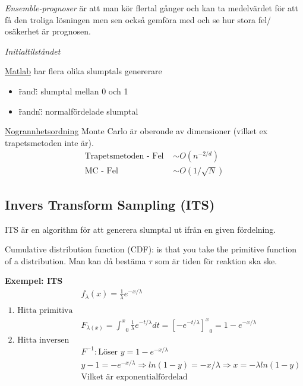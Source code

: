 \textit{Ensemble-prognoser} är att man kör flertal gånger och kan ta medelvärdet
för att få den troliga lösningen men sen också gemföra med och se hur stora fel/
osäkerhet är prognosen. \newline

\textit{Initialtilståndet} \newline

\underline{Matlab} har flera olika slumptals genererare
\begin{itemize}
  \item \"rand\": slumptal mellan 0 och 1
  \item \"randn\": normalfördelade slumptal
\end{itemize}

\underline{Nogrannhetsordning} Monte Carlo är oberonde av dimensioner 
(vilket ex trapetsmetoden inte är).
\begin{align*}
  \text{Trapetsmetoden - Fel } &\sim O(n^{-2/d})  \\
  \text{MC - Fel } &\sim O(1/\sqrt{N}) 
\end{align*}


\newpage

\subsection{Invers Transform Sampling (ITS)}
ITS är en algorithm för att generera slumptal ut ifrån 
en given fördelning.

Cumulative distribution function (CDF): is that you take the 
primitive function of a distribution. 
Man kan då bestäma $\tau$ som är tiden för reaktion ska ske.

\textbf{Exempel: ITS}
\begin{align*}
  &f_{\lambda}(x)=\frac{1}{\lambda}e^{-x/\lambda} \\
  &\\
  \text{1. Hitta primitiva funktionen }&   \\
  & F_{\lambda(x)} = {\int^x}_0 \frac{1}{\lambda}e^{-t/\lambda}dt 
  = {[-e^{-t/\lambda}]^x}_0
  = 1-e^{-x/\lambda} \\
  \text{2. Hitta inversen }& \\
  & F^{-1}: \text{Löser } y=1-e^{-x/\lambda} \\
  & y-1 = -e^{-x/\lambda} \Rightarrow ln(1-y)=-x/\lambda \Rightarrow x=-\lambda ln(1-y) \\
  &\text{Vilket är exponentialfördelad}
\end{align*}

